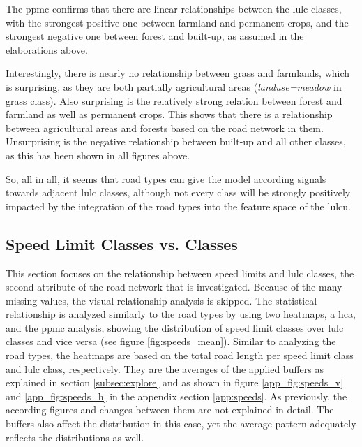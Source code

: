 The \gls{ppmc} confirms that there are linear relationships between the \gls{lulc} classes, with the strongest positive one between farmland and permanent crops, and the strongest negative one between forest and built-up, as assumed in the elaborations above.

Interestingly, there is nearly no relationship between grass and farmlands, which is surprising, as they are both partially agricultural areas (\emph{landuse=meadow} in grass class). Also surprising is the relatively strong relation between forest and farmland as well as permanent crops. This shows that there is a relationship between agricultural areas and forests based on the road network in them. Unsurprising is the negative relationship between built-up and all other classes, as this has been shown in all figures above.

So, all in all, it seems that road types can give the model according signals towards adjacent \gls{lulc} classes, although not every class will be strongly positively impacted by the integration of the road types into the feature space of the \gls{lulcu}.

\subsection{Speed Limit Classes vs.  Classes}

This section focuses on the relationship between speed limits and \gls{lulc} classes, the second attribute of the road network that is investigated. Because of the many missing values, the visual relationship analysis is skipped. The statistical relationship is analyzed similarly to the road types by using two heatmaps, a \gls{hca}, and the \gls{ppmc} analysis, showing the distribution of speed limit classes over \gls{lulc} classes and vice versa (see figure \ref{fig:speeds_mean}). Similar to analyzing the road types, the heatmaps are based on the total road length per speed limit class and \gls{lulc} class, respectively. They are the averages of the applied buffers as explained in section \ref{subsec:explore} and as shown in figure \ref{app_fig:speeds_v} and \ref{app_fig:speeds_h} in the appendix section \ref{app:speeds}. As previously, the according figures and changes between them are not explained in detail. The buffers also affect the distribution in this case, yet the average pattern adequately reflects the distributions as well.

